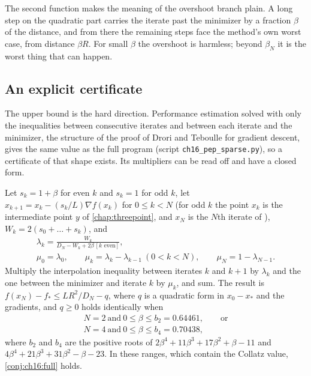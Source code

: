 The second function makes the meaning of the overshoot branch plain. A long
step on the quadratic part carries the iterate past the minimizer by a
fraction $\beta$ of the distance, and from there the remaining steps face the
method's own worst case, from distance $\beta R$. For small $\beta$ the overshoot is
harmless; beyond $\beta_N$ it is the worst thing that can happen.

\subsection{An explicit certificate}

The upper bound is the hard direction. Performance estimation solved with only
the inequalities between consecutive iterates and between each iterate and the
minimizer, the structure of the proof of Drori and Teboulle for gradient
descent, gives the same value as the full program (script
\texttt{ch16\_pep\_sparse.py}), so a certificate of that shape exists. Its
multipliers can be read off and have a closed form.

\begin{theorem}\label{thm:ch16:cert}
Let $s_k=1+\beta$ for even $k$ and $s_k=1$ for odd $k$, let $x_{k+1}=x_k-(s_k/L)\nabla f(x_k)$ for $0\le k<N$ (for odd $k$ the point $x_k$ is the intermediate point $y$ of \cref{chap:threepoint}, and $x_N$ is the $N$th iterate of \smmdet), $W_k=2(s_0+\dots+s_k)$, and
\begin{gather*}
  \lambda_k=\frac{W_k}{D_N-W_k+2\beta\,[k\text{ even}]},\\
  \mu_0=\lambda_0,\qquad\mu_k=\lambda_k-\lambda_{k-1}\ (0<k<N),\qquad\mu_N=1-\lambda_{N-1}.
\end{gather*}
Multiply the interpolation inequality between iterates $k$ and $k+1$ by
$\lambda_k$ and the one between the minimizer and iterate $k$ by $\mu_k$, and sum.
The result is $f(x_N)-f_*\le LR^2/D_N-q$, where $q$ is a quadratic form in
$x_0-x_*$ and the gradients, and $q\ge0$ holds identically when
\begin{gather*}
  N=2\ \text{and}\ 0\le\beta\le b_2=0.64461,\qquad\text{or}\\
  N=4\ \text{and}\ 0\le\beta\le b_4=0.70438,
\end{gather*}
where $b_2$ and $b_4$ are the positive roots of $2\beta^4+11\beta^3+17\beta^2+\beta-11$
and $4\beta^4+21\beta^3+31\beta^2-\beta-23$. In these ranges, which contain the
Collatz value, \cref{conj:ch16:full} holds.
\end{theorem}

